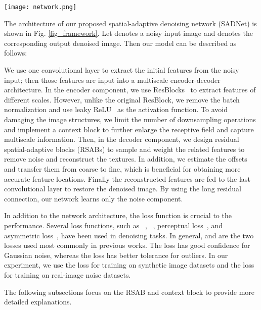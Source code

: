 \documentclass[runningheads]{llncs}
\begin{document}
\begin{figure*}[t]
\begin{center}
\texttt{[image: network.png]}
\end{center}
\setlength{\abovecaptionskip}{0.cm}
  \caption{The framework of our proposed spatial-adaptive denoising network.}
\label{fig_framework}
\end{figure*}

The architecture of our proposed spatial-adaptive denoising network (SADNet) is shown in Fig. \ref{fig_framework}. Let  denotes a noisy input image and  denotes the corresponding output denoised image. Then our model can be described as follows:

We use one convolutional layer to extract the initial features from the noisy input; then those features are input into a multiscale encoder-decoder architecture. In the encoder component, we use ResBlocks~\cite{he2016deep} to extract features of different scales. However, unlike the original ResBlock, we remove the batch normalization and use leaky ReLU~\cite{maas2013rectifier} as the activation function. To avoid damaging the image structures, we limit the number of downsampling operations and implement a context block to further enlarge the receptive field and capture multiscale information. Then, in the decoder component, we design residual spatial-adaptive blocks (RSABs) to sample and weight the related features to remove noise and reconstruct the textures. In addition, we estimate the offsets and transfer them from coarse to fine, which is beneficial for obtaining more accurate feature locations. Finally the reconstructed features are fed to the last convolutional layer to restore the denoised image. By using the long residual connection, our network learns only the noise component.

In addition to the network architecture, the loss function is crucial to the performance. Several loss functions, such as ~\cite{zhang2017beyond,zhang2018ffdnet,zhang2019residual}, ~\cite{anwar2019real}, perceptual loss~\cite{Jiao2017FormResNet}, and asymmetric loss~\cite{guo2019toward}, have been used in denoising tasks. In general,  and  are the two losses used most commonly in previous works. The  loss has good confidence for Gaussian noise, whereas the  loss has better tolerance for outliers. 
In our experiment, we use the  loss for training on synthetic image datasets and the  loss for training on real-image noise datasets.

The following subsections focus on the RSAB and context block to provide more detailed explanations.
\end{document}
